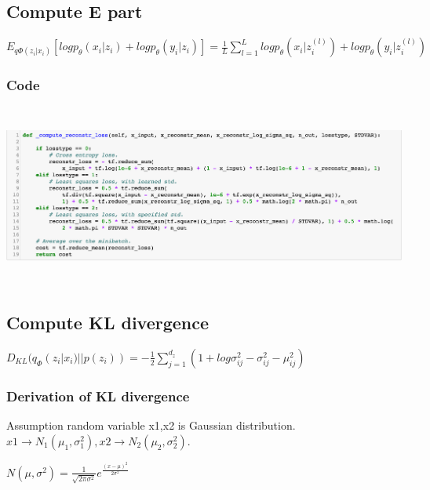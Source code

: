 \documentclass[a4paper]{article}
\begin{document}
\subsection{Compute E part}

$E_{q\Phi(z_i|x_i)}[logp_\theta(x_i|z_i) + logp_\theta(y_i|z_i)]=\frac{1}{L}\sum_{l=1}^L logp_\theta(x_i|z_i^{(l)})+logp_\theta(y_i|z_i^{(l)})$

\subsubsection{Code}
\includegraphics[width=17cm, height=6cm]{loss_code.png}

\subsection{Compute KL divergence}

$D_{KL}(q_\Phi(z_i|x_i)||p(z_i)) = -\frac{1}{2}\sum_{j=1}^{d_z}(1+log\sigma_{ij}^2 - \sigma_{ij}^2 - \mu_{ij}^2)$


\subsubsection{Derivation of KL divergence}
Assumption random variable x1,x2 is Gaussian distribution. $x1\to N_1(\mu_1,\sigma_1^2), x2\to N_2(\mu_2,\sigma_2^2)$. 

$N(\mu,\sigma^2) = \frac{1}{\sqrt{2\pi\sigma^2}}e^{\frac{(x-\mu)^2}{2\sigma^2}}$
\end{document}
